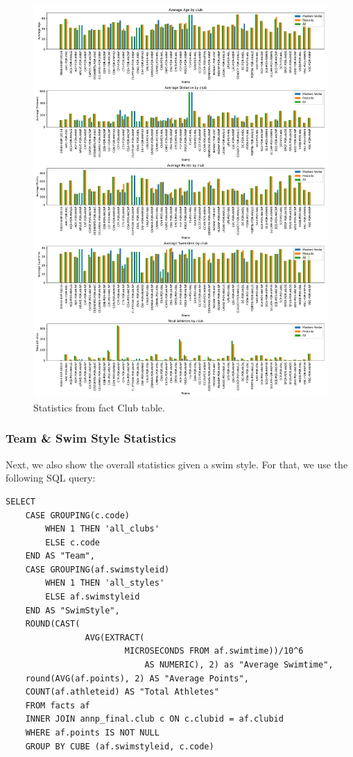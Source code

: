 \documentclass[a4paper, 11pt]{article}
\begin{document}
\begin{figure}[H]
    \centering
    \includegraphics[width=\textwidth]{img/club_fact1.pdf}
    \caption{Statistics from fact Club table.}
    \label{fig:clubs_fact}
\end{figure}

\subsubsection{Team \& Swim Style Statistics}

Next, we also show the overall statistics given a swim style. For that, we use the following SQL query:

\begin{verbatim}
SELECT
    CASE GROUPING(c.code)
        WHEN 1 THEN 'all_clubs'
        ELSE c.code
    END AS "Team",
    CASE GROUPING(af.swimstyleid)
        WHEN 1 THEN 'all_styles'
        ELSE af.swimstyleid
    END AS "SwimStyle",
    ROUND(CAST(
                AVG(EXTRACT(
                        MICROSECONDS FROM af.swimtime))/10^6 
                            AS NUMERIC), 2) as "Average Swimtime",
    round(AVG(af.points), 2) AS "Average Points",
    COUNT(af.athleteid) AS "Total Athletes"
    FROM facts af
    INNER JOIN annp_final.club c ON c.clubid = af.clubid
    WHERE af.points IS NOT NULL
    GROUP BY CUBE (af.swimstyleid, c.code)
\end{verbatim}
\end{document}

